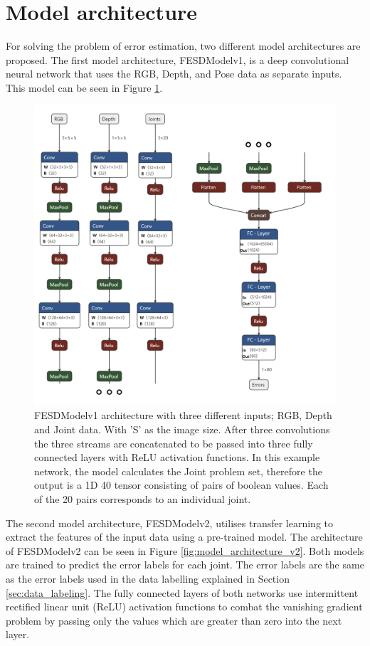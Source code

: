 \section{Model architecture}
\label{sec:model_architecture}

For solving the problem of error estimation, two different model architectures are proposed. The first model architecture, FESDModelv1, is a deep convolutional neural network that uses the RGB, Depth, and Pose data as separate inputs. This model can be seen in Figure \ref{fig:model_architecture_v1}.

\begin{figure}[htbp]
  \centering
  \includegraphics[width=.8\linewidth]{figures/Model/FESD.png}
  \caption[FESDModel architecture version 1]{FESDModelv1 architecture with three different inputs; RGB, Depth and Joint data. With 'S' as the image size. After three convolutions the three streams are concatenated to be passed into three fully connected layers with ReLU activation functions. In this example network, the model calculates the Joint problem set, therefore the output is a 1D 40 tensor consisting of pairs of boolean values. Each of the 20 pairs corresponds to an individual joint.}
  \label{fig:model_architecture_v1}
\end{figure}

The second model architecture, FESDModelv2, utilises transfer learning to extract the features of the input data using a pre-trained model. The architecture of FESDModelv2 can be seen in Figure \ref{fig:model_architecture_v2}. Both models are trained to predict the error labels for each joint. The error labels are the same as the error labels used in the data labelling explained in Section \ref{sec:data_labeling}. The fully connected layers of both networks use intermittent rectified linear unit (ReLU) activation functions to combat the vanishing gradient problem by passing only the values which are greater than zero into the next layer.


